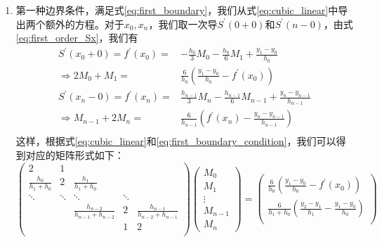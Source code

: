 \begin{enumerate}
	\item 第一种边界条件，满足式\eqref{eq:first_boundary}，我们从式\eqref{eq:cubic_linear}中导出两个额外的方程。对于$x_0, x_n$，我们取一次导$S^{\prime}(0+0)$和$S^{\prime}(n-0)$，由式\eqref{eq:first_order_Sx}，我们有
		\begin{equation}
			\begin{aligned}
				S^{\prime}(x_0+0) = f^{\prime}(x_0) =& - \frac{h_0}{3}M_0 - \frac{h_0}{6}M_{1} + \frac{y_{1} - y_0}{h_0}	\\
				\Rightarrow 
				2M_0 + M_1 =& \frac{6}{h_0} \left( \frac{y_1 - y_0}{h_0} - f^{\prime}(x_0) \right)	\\
				S^{\prime}(x_n-0) = f^{\prime}(x_n) =& \frac{h_{n-1}}{3}M_n - \frac{h_{n-1}}{6}M_{n-1} + \frac{y_{n} - y_{n-1}}{h_{n-1}}	\\
				\Rightarrow 
				M_{n-1} + 2M_n =& \frac{6}{h_{n-1}} \left( f^{\prime}(x_{n}) - \frac{y_{n} - y_{n-1}}{h_{n-1}} \right)	\\
			\end{aligned}
			\label{eq:first_boundary_condition}
		\end{equation} 
		这样，根据式\eqref{eq:cubic_linear}和\eqref{eq:first_boundary_condition}，我们可以得到对应的矩阵形式如下：
		\begin{equation}
			\begin{pmatrix}
				2						&	1	&	~						&	~	&	~\\
				\frac{h_0}{h_1 + h_{0}}	&	2	&	\frac{h_1}{h_1 + h_0}	&	~	&	~\\
				\ddots	&	\ddots		&	\ddots	&	\ddots	&	~\\
				~		&	~			&	\frac{h_{n-2}}{h_{n-1}+h_{n-2}}	&	2	&	\frac{h_{n-1}}{h_{n-2} + h_{n-1}}\\
				~		&	~			&	~	&	1	&	2\\
			\end{pmatrix}
			\begin{pmatrix}
				M_0		\\
				M_1		\\	
				\vdots	\\
				M_{n-1}	\\
				M_{n}	
			\end{pmatrix}
			=
			\begin{pmatrix}
				\frac{6}{h_0}\left(\frac{y_1-y_0}{h_0} - f^{\prime}(x_0)\right)	\\
				\frac{6}{h_1 + h_0}\left(\frac{y_2-y_1}{h_1} - \frac{y_1 - y_0}{h_{0}}\right)	\\

\end{pmatrix}
\end{equation}
\end{enumerate}
